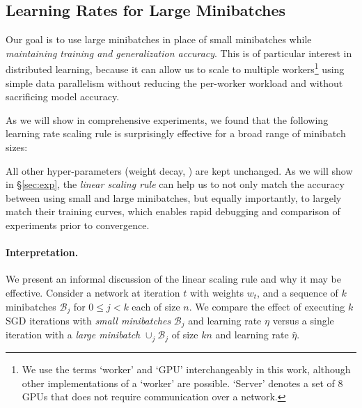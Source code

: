 \documentclass[10pt,twocolumn,letterpaper]{article}
\def\B{\mathcal{B}}
\begin{document}
\subsection{Learning Rates for Large Minibatches}\label{sec:lr_rule}

Our goal is to use large minibatches in place of small minibatches while \emph{maintaining training and generalization accuracy}. This is of particular interest in distributed learning, because it can allow us to scale to multiple workers\footnote{We use the terms `worker' and `GPU' interchangeably in this work, although other implementations of a `worker' are possible. `Server' denotes a set of 8 GPUs that does not require communication over a network.} using simple data parallelism without reducing the per-worker workload and without sacrificing model accuracy.

As we will show in comprehensive experiments, we found that the following learning rate scaling rule is surprisingly effective for a broad range of minibatch sizes:
\begin{center}
\end{center}
All other hyper-parameters (weight decay, \etc) are kept unchanged. As we will show in \S\ref{sec:exp}, the \emph{linear scaling rule} can help us to not only match the accuracy between using small and large minibatches, but equally importantly, to largely match their training curves, which enables rapid debugging and comparison of experiments prior to convergence.

\paragraph{Interpretation.} We present an informal discussion of the linear scaling rule and why it may be effective. Consider a network at iteration $t$ with weights $w_t$, and a sequence of $k$ minibatches $\B_j$ for $0\le j<k$ each of size $n$. We compare the effect of executing $k$ SGD iterations  with \emph{small minibatches} $\B_j$ and learning rate $\eta$ versus a single iteration with a \emph{large minibatch} $\cup_j \B_j$ of size $kn$ and learning rate $\hat\eta$.
\end{document}
